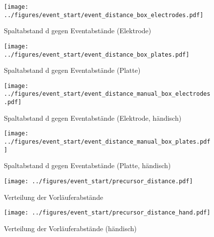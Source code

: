 \begin{figure}[htbp]
    \centering
    \begin{minipage}[t]{0.47\textwidth}
      \centering
      \texttt{[image: ../figures/event\_start/event\_distance\_box\_electrodes.pdf]}
      \caption{Spaltabstand d gegen Eventabstände (Elektrode)}
      \label{fig:box-eventdistance-electrode}
   \end{minipage}
 \begin{minipage}[t]{0.47\textwidth}
      \centering
      \texttt{[image: ../figures/event\_start/event\_distance\_box\_plates.pdf]}
      \caption{Spaltabstand d gegen Eventabstände (Platte)}
      \label{fig:box-eventdistance-plate}
  \end{minipage}
\begin{minipage}[t]{0.47\textwidth}
      \centering
      \texttt{[image: ../figures/event\_start/event\_distance\_manual\_box\_electrodes.pdf]}
      \caption{Spaltabstand d gegen Eventabstände (Elektrode, händisch)}
      \label{fig:box-eventdistance-electrode-hand}
   \end{minipage}
 \begin{minipage}[t]{0.47\textwidth}
      \centering
      \texttt{[image: ../figures/event\_start/event\_distance\_manual\_box\_plates.pdf]}
      \caption{Spaltabstand d gegen Eventabstände (Platte, händisch)}
      \label{fig:box-eventdistance-plate-hand}
  \end{minipage}

\end{figure}


\begin{figure}[htbp]
    \centering
    \begin{minipage}[t]{0.47\textwidth}
      \centering
      \texttt{[image: ../figures/event\_start/precursor\_distance.pdf]}
      \caption{Verteilung der Vorläuferabstände}
      \label{fig:histogram-precdistance}
   \end{minipage}
 \begin{minipage}[t]{0.47\textwidth}
      \centering
      \texttt{[image: ../figures/event\_start/precursor\_distance\_hand.pdf]}
      \caption{Verteilung der Vorläuferabstände (händisch)}
      \label{fig:histogram-precdistance-hand}
  \end{minipage}
\end{figure}

